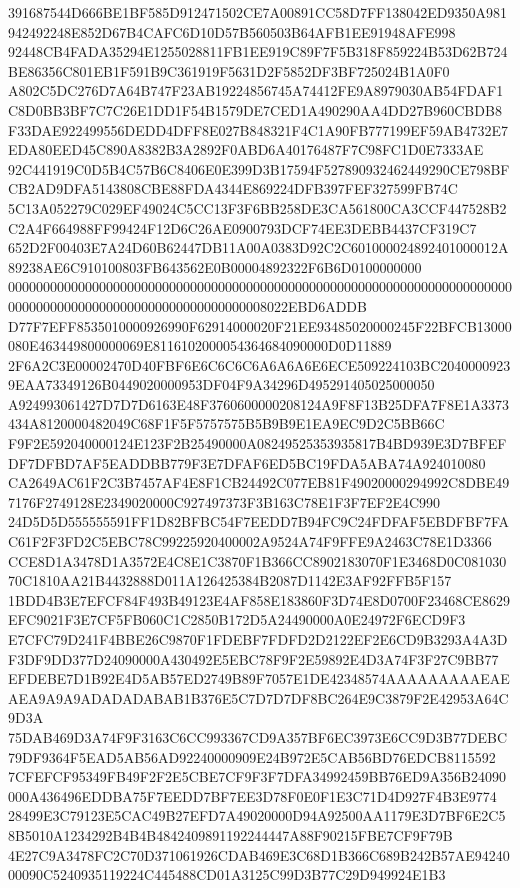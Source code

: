 \documentclass[UTF8,fontset=fandol,zihao=-4,a4paper]{ctexart}
\begin{document}
{{391687544D666BE1BF585D912471502CE7A00891CC58D7FF138042ED9350A981942492248E852D67B4CAFC6D10D57B560503B64AFB1EE91948AFE998
92448CB4FADA35294E1255028811FB1EE919C89F7F5B318F859224B53D62B724BE86356C801EB1F591B9C361919F5631D2F5852DF3BF725024B1A0F0
A802C5DC276D7A64B747F23AB19224856745A74412FE9A8979030AB54FDAF1C8D0BB3BF7C7C26E1DD1F54B1579DE7CED1A490290AA4DD27B960CBDB8
F33DAE922499556DEDD4DFF8E027B848321F4C1A90FB777199EF59AB4732E7EDA80EED45C890A8382B3A2892F0ABD6A40176487F7C98FC1D0E7333AE
92C441919C0D5B4C57B6C8406E0E399D3B17594F527890932462449290CE798BFCB2AD9DFA5143808CBE88FDA4344E869224DFB397FEF327599FB74C
5C13A052279C029EF49024C5CC13F3F6BB258DE3CA561800CA3CCF447528B2C2A4F664988FF99424F12D6C26AE0900793DCF74EE3DEBB4437CF319C7
652D2F00403E7A24D60B62447DB11A00A0383D92C2C601000024892401000012A89238AE6C910100803FB643562E0B00004892322F6B6D0100000000
0000000000000000000000000000000000000000000000000000000000000000000000000000000000000000000000000000000000008022EBD6ADDB
D77F7EFF8535010000926990F62914000020F21EE93485020000245F22BFCB13000080E463449800000069E8116102000054364684090000D0D11889
2F6A2C3E00002470D40FBF6E6C6C6C6A6A6A6E6ECE509224103BC20400009239EAA73349126B0449020000953DF04F9A34296D495291405025000050
A924993061427D7D7D6163E48F3760600000208124A9F8F13B25DFA7F8E1A3373434A8120000482049C68F1F5F5757575B5B9B9E1EA9EC9D2C5BB66C
F9F2E592040000124E123F2B25490000A08249525353935817B4BD939E3D7BFEFDF7DFBD7AF5EADDBB779F3E7DFAF6ED5BC19FDA5ABA74A924010080
CA2649AC61F2C3B7457AF4E8F1CB24492C077EB81F49020000294992C8DBE497176F2749128E2349020000C927497373F3B163C78E1F3F7EF2E4C990
24D5D5D555555591FF1D82BFBC54F7EEDD7B94FC9C24FDFAF5EBDFBF7FAC61F2F3FD2C5EBC78C99225920400002A9524A74F9FFE9A2463C78E1D3366
CCE8D1A3478D1A3572E4C8E1C3870F1B366CC8902183070F1E3468D0C08103070C1810AA21B4432888D011A126425384B2087D1142E3AF92FFB5F157
1BDD4B3E7EFCF84F493B49123E4AF858E183860F3D74E8D0700F23468CE8629EFC9021F3E7CF5FB060C1C2850B172D5A24490000A0E24972F6ECD9F3
E7CFC79D241F4BBE26C9870F1FDEBF7FDFD2D2122EF2E6CD9B3293A4A3DF3DF9DD377D24090000A430492E5EBC78F9F2E59892E4D3A74F3F27C9BB77
EFDEBE7D1B92E4D5AB57ED2749B89F7057E1DE42348574AAAAAAAAAEAEAEA9A9A9ADADADABAB1B376E5C7D7D7DF8BC264E9C3879F2E42953A64C9D3A
75DAB469D3A74F9F3163C6CC993367CD9A357BF6EC3973E6CC9D3B77DEBC79DF9364F5EAD5AB56AD92240000909E24B972E5CAB56BD76EDCB8115592
7CFEFCF95349FB49F2F2E5CBE7CF9F3F7DFA34992459BB76ED9A356B24090000A436496EDDBA75F7EEDD7BF7EE3D78F0E0F1E3C71D4D927F4B3E9774
28499E3C79123E5CAC49B27EFD7A49020000D94A92500AA1179E3D7BF6E2C58B5010A1234292B4B4B4842409891192244447A88F90215FBE7CF9F79B
4E27C9A3478FC2C70D371061926CDAB469E3C68D1B366C689B242B57AE9424000090C5240935119224C445488CD01A3125C99D3B77C29D949924E1B3
}}
\end{document}
